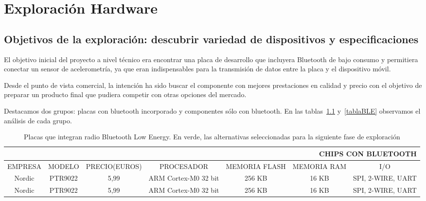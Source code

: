 
\cleardoublepage


\chapter{Exploración Hardware}
\label{makereference3}

\section{Objetivos de la exploración: descubrir variedad de dispositivos y especificaciones}
\label{makereference3.1}

El objetivo inicial del proyecto a nivel técnico era encontrar una placa de desarrollo que incluyera Bluetooth de bajo consumo y permitiera conectar  un sensor de acelerometría, ya que eran indispensables para la transmisión de datos entre la placa y el dispositivo móvil. 

Desde el punto de vista comercial, la intención ha sido buscar el componente con mejores prestaciones en calidad y precio con el objetivo de preparar un producto final que pudiera competir con otras opciones del mercado.

Destacamos dos grupos: placas con bluetooth incorporado y componentes sólo con  bluetooth. En las tablas~\ref{tablaSoCBLE} y~\ref{tablaBLE} observamos el análisis de cada grupo.

\begin{table}
	\begin{center}
	\begin{tabular}[c]{|c|c|c|c|c|c|c|}
        \hline
        \multicolumn{7}{r}{CHIPS CON BLUETOOTH} \\
        \hline
        EMPRESA & MODELO & PRECIO(EUROS) & PROCESADOR & MEMORIA FLASH & MEMORIA RAM & I/O \\
        \hline
        Nordic & PTR9022 & 5,99 & ARM Cortex-M0 32 bit & 256 KB & 16 KB & SPI, 2-WIRE, UART \\
        Nordic & PTR9022 & 5,99 & ARM Cortex-M0 32 bit & 256 KB & 16 KB & SPI, 2-WIRE, UART \\
    	\hline
	\end{tabular}
    \caption{Placas que integran radio Bluetooth Low Energy. En verde, las alternativas seleccionadas para la siguiente fase de exploración}
    \label{tablaSoCBLE}
   \end{center}
\end{table}

